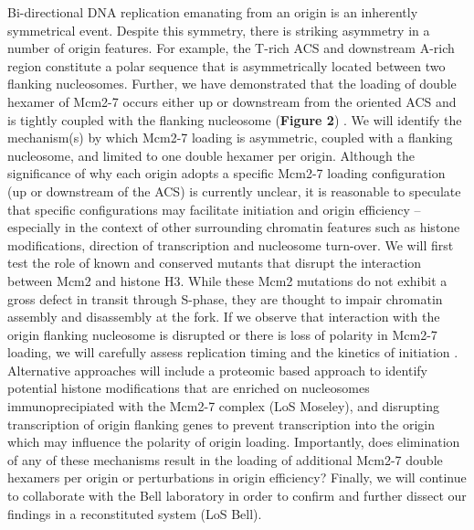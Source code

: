 Bi-directional DNA replication emanating from an origin is an inherently symmetrical event.  Despite this symmetry, there is striking asymmetry in a number of origin features.  For example, the T-rich ACS and downstream A-rich region constitute a polar sequence that is asymmetrically located between two flanking nucleosomes. Further, we have demonstrated that the loading of double hexamer of Mcm2-7 occurs either up or downstream from the oriented ACS and is tightly coupled with the flanking nucleosome ({\color{dukeblue}\textbf{Figure 2}}) \citep{Belsky2015-li}. We will identify the mechanism(s) by which Mcm2-7 loading is asymmetric, coupled with a flanking nucleosome, and limited to one double hexamer per origin.  Although the significance of why each origin adopts a specific Mcm2-7 loading configuration (up or downstream of the ACS) is currently unclear, it is reasonable to speculate that specific configurations may facilitate initiation and origin efficiency -- especially in the context of other surrounding chromatin features such as histone modifications, direction of transcription and nucleosome turn-over.  We will first test the role of known and conserved mutants that disrupt the interaction between Mcm2 and histone H3\citep{Huang2015-fk,Foltman2013-dk}.  While these Mcm2 mutations do not exhibit a gross defect in transit through S-phase, they are thought to impair chromatin assembly and disassembly at the fork\citep{Foltman2013-dk}.  If we observe that interaction with the origin flanking nucleosome is disrupted or there is loss of polarity in Mcm2-7 loading, we will carefully assess replication timing and the kinetics of initiation \invivo.  Alternative approaches will include a proteomic based approach to identify potential histone modifications that are enriched on nucleosomes immunoprecipiated with the Mcm2-7 complex (LoS Moseley), and disrupting transcription of origin flanking genes to prevent transcription into the origin which may influence the polarity of origin loading\citep{Gros2015-oo}.  Importantly, does elimination of any of these mechanisms result in the loading of additional Mcm2-7 double hexamers per origin or perturbations in origin efficiency? Finally, we will continue to collaborate with the Bell laboratory in order to confirm and further dissect our \invivo findings in a reconstituted system (LoS Bell).  

